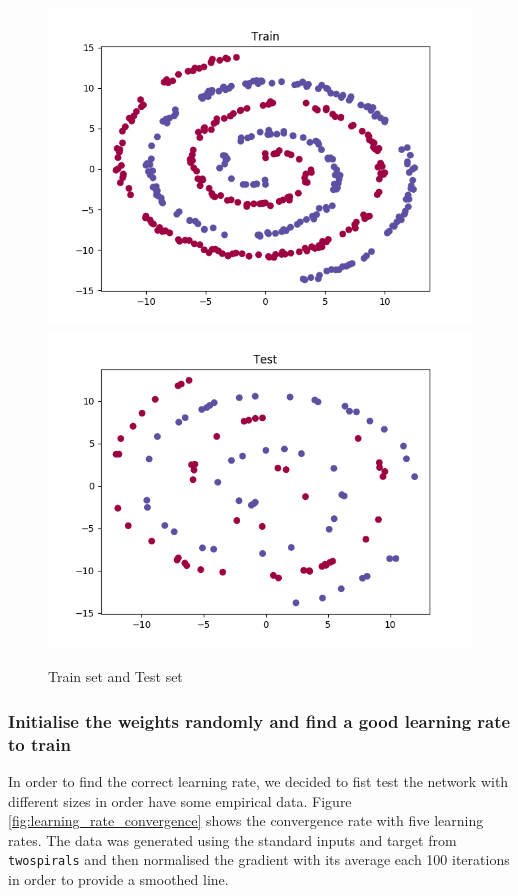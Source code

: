 \documentclass[11pt]{article}
\begin{document}
\begin{figure}[h]
	\centering
	\label{fig: train_test_set}
	\includegraphics[scale=0.5]{images/train_set}
	\includegraphics[scale=0.5]{images/test_set}
	\caption{Train set and Test set}
\end{figure}


\subsubsection{Initialise the weights randomly and find a good learning rate to train}
In order to find the correct learning rate, we decided to fist test the network with different sizes in order have some empirical data. Figure \ref{fig:learning_rate_convergence} shows the convergence rate with five learning rates. The data was generated using the standard inputs and target from \texttt{twospirals} and then normalised the gradient with its average each 100 iterations in order to provide a smoothed line.
\end{document}
